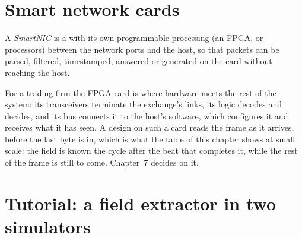 \section{Smart network cards}

\begin{definition}[SmartNIC]\label{def:nw:programmable-hardware-i-architecture-and-toolchain:smartnic}
A \emph{SmartNIC} is a  with its own programmable processing (an FPGA, or processors) between the
network ports and the host, so that packets can be parsed, filtered, timestamped, answered or generated on the card without reaching
the host.
\end{definition}

For a trading firm the FPGA card is where hardware meets the rest of the system: its transceivers terminate the exchange's links, its
logic decodes and decides, and its bus connects it to the host's software, which configures it and receives what it has seen. A design
on such a card reads the frame as it arrives, before the last byte is in, which is what the table of this chapter shows at small scale:
the field is known the cycle after the beat that completes it, while the rest of the frame is still to come. Chapter~7 decides on it.

\section{Tutorial: a field extractor in two simulators}\label{tut:nw:programmable-hardware-i-architecture-and-toolchain:tut}

